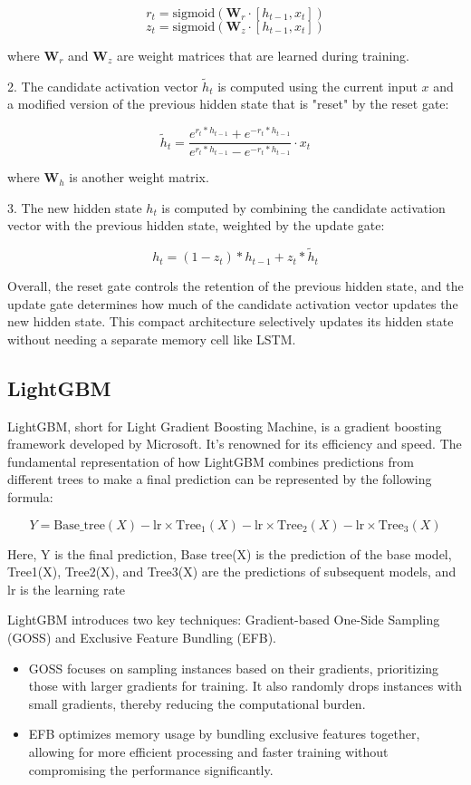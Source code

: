 \documentclass{ieeeojies}
\begin{document}
 \[
  r_t = \text{sigmoid}(\mathbf{W}_r \cdot [h_{t-1}, x_t])
  \]
  \[
  z_t = \text{sigmoid}(\mathbf{W}_z \cdot [h_{t-1}, x_t])
  \]

where \( \mathbf{W}_r \) and \( \mathbf{W}_z \) are weight matrices that are learned during training.

 2. The candidate activation vector \( \tilde{h}_t \) is computed using the current input \( x \) and a modified version of the previous hidden state that is "reset" by the reset gate:

\[ \tilde{h}_t = \frac{{e^{r_t \ast h_{t-1}} + e^{-r_t \ast h_{t-1}}}}{{e^{r_t \ast h_{t-1}} - e^{-r_t \ast h_{t-1}}}} \cdot x_t \]

where \( \mathbf{W}_h \) is another weight matrix.

 3. The new hidden state \( h_t \) is computed by combining the candidate activation vector with the previous hidden state, weighted by the update gate:

\[ h_t = (1 - z_t) \ast h_{t-1} + z_t \ast \tilde{h}_t \]

 Overall, the reset gate controls the retention of the previous hidden state, and the update gate determines how much of the candidate activation vector updates the new hidden state. This compact architecture selectively updates its hidden state without needing a separate memory cell like LSTM.
 \subsection{LightGBM}
 LightGBM, short for Light Gradient Boosting Machine, is a gradient boosting framework developed by Microsoft. It’s renowned for its efficiency and speed. The fundamental representation of how LightGBM combines predictions from different trees to make a final prediction can be represented by the following formula:

\[ 
Y = \text{Base\_tree}(X) - \text{lr} \times \text{Tree}_{1}(X) - \text{lr} \times \text{Tree}_{2}(X) - \text{lr} \times \text{Tree}_{3}(X) 
\]

 Here, Y is the final prediction, Base tree(X) is the prediction of the base model, Tree1(X), Tree2(X), and Tree3(X) are the predictions of subsequent models, and lr is the learning rate

 LightGBM introduces two key techniques: Gradient-based One-Side Sampling (GOSS) and Exclusive Feature Bundling (EFB).
 
 \begin{itemize}
    \item GOSS focuses on sampling instances based on their gradients, prioritizing those with larger gradients for training. It also randomly drops instances with small gradients, thereby reducing the computational burden.
    \item EFB optimizes memory usage by bundling exclusive features together, allowing for more efficient processing and faster training without compromising the performance significantly.
 \end{itemize}
\end{document}
